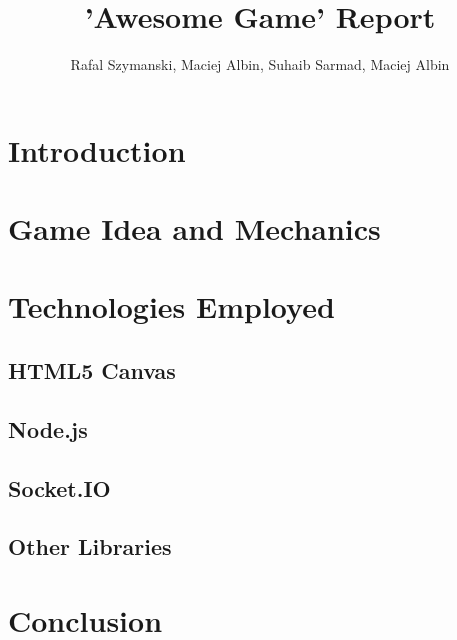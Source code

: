 \documentclass[a4paper,11pt]{article}
\title{'Awesome Game' Report}
\author{Rafal Szymanski, Maciej Albin, Suhaib Sarmad, Maciej Albin}
\begin{document}
 
	\maketitle
	
	\section{Introduction}
	
	\section{Game Idea and Mechanics}
	
	\section{Technologies Employed}
		
		\subsection{HTML5 Canvas}
		
		\subsection{Node.js}
		
		\subsection{Socket.IO}
		
		\subsection{Other Libraries}
		
	\section{Conclusion}
	
	
\end{document}
